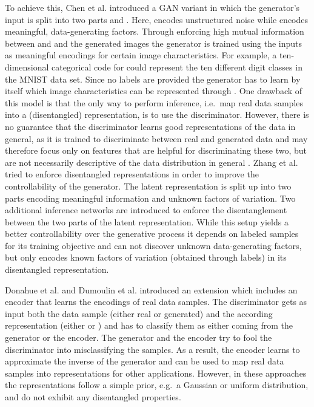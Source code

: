 \documentclass{esannV2}
\begin{document}
To achieve this, Chen et al. \cite{Chen2016} introduced a GAN variant in which the generator's input is split into two parts  and . Here,  encodes unstructured noise while  encodes meaningful, data-generating factors. Through enforcing high mutual information between  and and the generated images  the generator is trained using the inputs  as meaningful encodings for certain image characteristics. For example, a ten-dimensional categorical code for  could represent the ten different digit classes in the MNIST data set. Since no labels are provided the generator has to learn by itself which image characteristics can be represented through .
One drawback of this model is that the only way to perform inference, i.e.\ map real data samples into a (disentangled) representation, is to use the discriminator. However, there is no guarantee that the discriminator learns good representations of the data in general, as it is trained to discriminate between real and generated data and may therefore focus only on features that are helpful for discriminating these two, but are not necessarily descriptive of the data distribution in general \cite{Donahue2017}.
Zhang et al. \cite{Zhang2017} tried to enforce disentangled representations in order to improve the controllability of the generator. The latent representation is split up into two parts encoding meaningful information and unknown factors of variation. Two additional inference networks are introduced to enforce the disentanglement between the two parts of the latent representation. While this setup yields a better controllability over the generative process it depends on labeled samples for its training objective and can not discover unknown data-generating factors, but only encodes known factors of variation (obtained through labels) in its disentangled representation.

Donahue et al. \cite{Donahue2017} and Dumoulin et al. \cite{Dumoulin2017} introduced an extension which includes an encoder  that learns the encodings of real data samples. The discriminator gets as input both the data sample  (either real or generated) and the according representation (either  or ) and has to classify them as either coming from the generator or the encoder. The generator and the encoder try to fool the discriminator into misclassifying the samples. As a result, the encoder  learns to approximate the inverse of the generator  and can be used to map real data samples into representations for other applications. However, in these approaches the representations follow a simple prior, e.g.\ a Gaussian or uniform distribution, and do not exhibit any disentangled properties.
\end{document}
